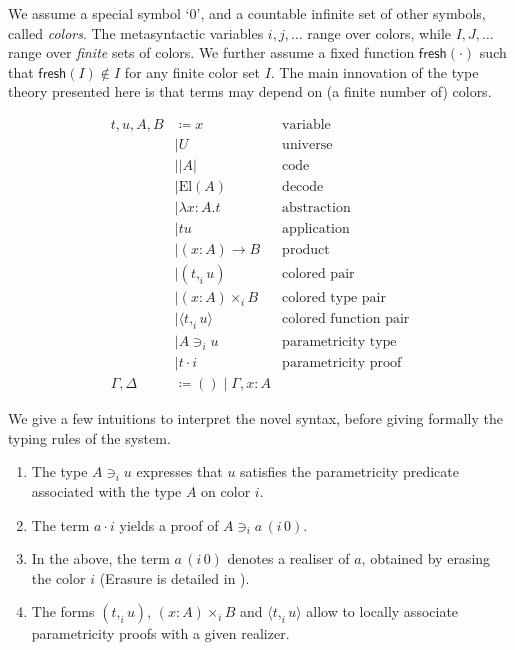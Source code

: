 \documentclass[english]{PaperTools/latex/lipics}
\newcommand\CP[3]{(#2,_{#1} #3)}
\newcommand\CTimes[2]{(#2) ×_{#1}}
\newcommand\param[1]{\!\cdot\!#1}
\newcommand\op[1]{∋_{#1}}
\newcommand\fp[3]{⟨#2 ,_{#1} #3⟩}
\newcommand\mor[2]{({#1}\,{#2})}
\newcommand\proj[2]{{#2}\,\mor{#1}0}
\def\fresh#1{\mathsf{fresh}(#1)}
\def\El#1{\mathrm{El}(#1)}
\begin{document}
We assume a special symbol ‘0’, and a countable infinite set of other
symbols, called \emph{colors}.
The metasyntactic variables $i,j,\ldots$ range over colors, while
$I,J,…$ range over \emph{finite} sets of colors.
We further assume a fixed function $\fresh{·}$ such that
$\fresh{I} ∉ I$ for any finite color set $I$.
%
The main innovation of the type theory
presented here is that terms may depend on (a finite number of)
colors.
\begin{definition}
  \begin{align*}
    t,u,A,B & \coloneqq x & \text {variable} \\
            & \mid U & \text{universe} \\ 
            & \mid |A| & \text{code} \\ 
            & \mid \El{A} & \text{decode} \\
            & \mid λx:A. t & \text{abstraction} \\
            & \mid t u & \text{application} \\ 
            & \mid (x:A) → B & \text{product} \\
            & \mid \CP i t u & \text{colored pair} \\
            & \mid \CTimes i {x:A} B  & \text{colored type pair} \\
            & \mid \fp i t u & \text{colored function pair}\\
            & \mid A \op i u & \text{parametricity type} \\
            & \mid t \param i & \text{parametricity proof} \\
    \Gamma,\Delta & \coloneqq () \mid \Gamma,x:A
  \end{align*}
\end{definition}

We give a few intuitions to interpret the novel syntax, before giving formally the typing rules of the system. 
\begin{enumerate}
\item The type $A \op i u$ expresses that $u$ satisfies the
  parametricity predicate associated with the type $A$ on color $i$.
\item The term $a \param i$ yields a proof of $A \op i \proj i a$.
\item In the above, the term $\proj i a$ denotes a realiser of $a$,
  obtained by erasing the color $i$ (Erasure is detailed in
  ).
\item The forms $\CP i t u$, $\CTimes i {x:A} B$ and $\fp i t u$ allow to
  locally associate parametricity proofs with a given realizer.
\end{enumerate}
\end{document}
